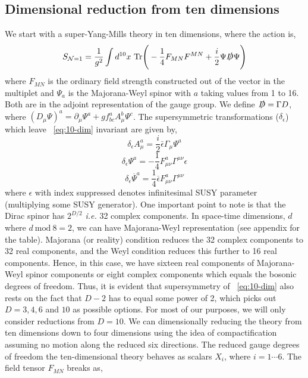 \subsection{Dimensional reduction from ten dimensions} 
We start with a super-Yang-Mills theory in ten dimensions, where the action is, 
\begin{equation}
S_{\mathcal{N} = 1} = \frac{1}{g^2} \int d^{10} x ~ \mathrm{Tr} \Bigg (-\frac{1}{4} F_{MN}F^{MN} +\frac{i}{2} \Psi \slashed{D} \Psi \Bigg) 
\label{eq:10-dim} 
\end{equation}
where $F_{MN}$ is the ordinary field strength constructed out of the vector in the multiplet
and $\Psi_{a}$ is the Majorana-Weyl spinor with $a$ taking values from 1 to 16. Both are in the 
adjoint representation of the gauge group. We define $ \slashed{D} = \Gamma D $, where
$ (D_{\mu} \Psi)^{a} = \partial_{\mu} \Psi^{a} + g f^{a}_{bc} A_{\mu}^{b} \Psi^{c}$. 
The supersymmetric transformations ($\delta_{\epsilon}$) which leave ~\ref{eq:10-dim} invariant are given by, 
\begin{equation}
\delta_{\epsilon} A_{\mu}^{a} = \frac{i}{2} \bar{\epsilon} \Gamma_{\mu} \Psi^{a} 
\end{equation} 
\begin{equation}
\delta_{\epsilon} \Psi^{a} = -\frac{1}{4}F_{\mu\nu}^{a} \Gamma^{\mu \nu} \epsilon
\end{equation}
\begin{equation}
\delta_{\epsilon} \overline{\Psi}^a = \frac{1}{4} \overline{\epsilon} F_{\mu\nu}^{a} \Gamma^{\mu \nu} 
\end{equation}
where $\epsilon$ with index suppressed denotes infinitesimal SUSY parameter (multiplying 
some SUSY generator). One important point to note is that the Dirac spinor has $2^{D/2}$ \emph{i.e.} 
32 complex components. 
In space-time dimensions, $d$ where $ d ~ \text{mod} ~ 8 = 2$, we can have 
Majorana-Weyl representation (see appendix for the table). Majorana (or reality) condition reduces the 
32 complex components to 32 real components, and the Weyl condition reduces this further to 16 real components. 
Hence, in this case, we have sixteen real components of Majorana-Weyl spinor components or eight complex components
which equals the bosonic degrees of freedom. Thus, it is evident that supersymmetry of 
~\ref{eq:10-dim} also rests on the fact that $D-2$ has to equal some power of 2, 
which picks out $D=3,4,6$ and $10$ as possible options. For most of our purposes, 
we will only consider reductions from $D=10$. 
We can dimensionally reducing the theory from ten dimensions down to four dimensions 
using the idea of compactification assuming no motion along the reduced six directions. 
The reduced gauge degrees of freedom the ten-dimensional theory 
behaves as scalars $X_{i}$, where $ i = 1 \cdots 6$. The field tensor $F_{MN}$ breaks as,  

